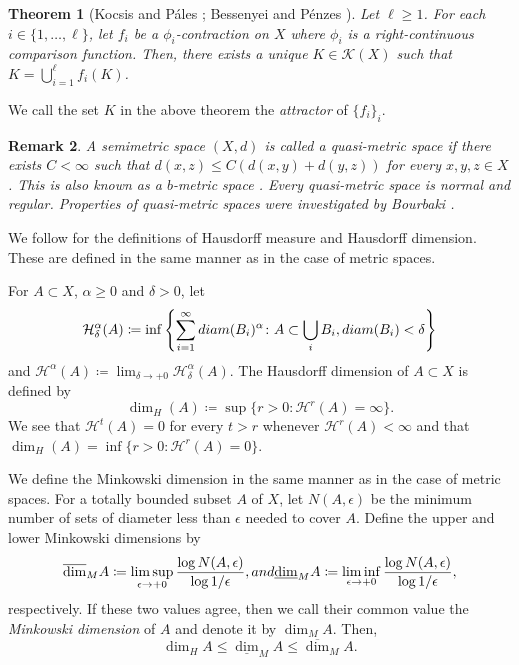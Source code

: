 \documentclass[10pt,a4paper]{amsart}
\newtheorem{Thm}{Theorem}[section]
\newtheorem{Rem}[Thm]{Remark}
\begin{document}
\begin{Thm}[Kocsis and P\'ales {\cite[Theorem 17]{KocsisPales2022}}; Bessenyei and P\'{e}nzes {\cite[Theorem 2]{BessenyeiPenzes2022}}]\label{thm:attractor}
Let $\ell \ge 1$. 
For each $i \in \{1, \dots, \ell\}$, 
let $f_i$ be a $\phi_i$-contraction on $X$ where $\phi_i$ is a right-continuous comparison function.
Then, there exists a unique $K \in \mathcal{K}(X)$ such that $K = \bigcup_{i=1}^{\ell} f_i (K)$. 
\end{Thm}

We call the set $K$ in the above theorem the {\it attractor} of $\{f_i\}_i$. 


\begin{Rem}
A semimetric space $(X,d)$ is called a {\it quasi-metric space} if there exists $C < \infty$ such that $d(x,z) \le C(d(x,y) + d(y,z))$ for every $x, y, z \in X$. 
This is also known as a {\it $b$-metric space} \cite{CJT2018}. 
Every quasi-metric space is normal and regular. 
Properties of quasi-metric spaces were investigated by Bourbaki \cite{Bourbaki2007}. 
\end{Rem}




We follow \cite{BessenyeiPenzes2022} for the definitions of Hausdorff measure and Hausdorff dimension. 
These are defined in the same manner as in the case of metric spaces. 

For $A \subset X$, $\alpha \ge 0$ and $\delta > 0$, let 
\[ \mathcal{H}^{\alpha}_{\delta}(A) \coloneqq \inf\left\{ \sum_{i=1}^{\infty} \textup{diam}(B_i)^{\alpha} \colon A \subset \bigcup_{i} B_{i}, \textup{diam}(B_i) < \delta   \right\} \]
and $\mathcal{H}^{\alpha}(A) \coloneqq \lim_{\delta \to +0} \mathcal{H}^{\alpha}_{\delta}(A)$. 
The Hausdorff dimension of $A \subset X$ is defined by 
\[ \dim_H (A) \coloneqq \sup\{r > 0 \colon \mathcal{H}^r (A) = \infty \}. \]
We see that $\mathcal{H}^t (A) = 0$ for every $t > r$ whenever $\mathcal{H}^r (A) < \infty$ and that $\dim_H (A) = \inf\{r > 0 \colon \mathcal{H}^{r}(A) = 0\}$. 

We define the Minkowski dimension in the same manner as in the case of metric spaces. 
For a totally bounded subset $A$ of $X$, 
let $N(A, \epsilon)$ be the minimum number of sets of diameter less than $\epsilon$ needed to cover $A$. 
Define the upper and lower Minkowski dimensions by 
\[ \overline{\dim}_M A \coloneqq \limsup_{\epsilon \to +0} \frac{\log N(A, \epsilon)}{\log 1/\epsilon},  \textup{ and } \underline{\dim}_M A \coloneqq \liminf_{\epsilon \to +0} \frac{\log N(A, \epsilon)}{\log 1/\epsilon},  \]
respectively. 
If these two values agree, then we call their common value the {\it Minkowski dimension} of $A$ and denote it by $\dim_M A$. 
Then, 
\[ \dim_H A \le \underline{\dim}_M A \le \overline{\dim}_M  A.  \]
\end{document}
